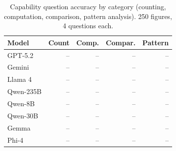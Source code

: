 \begin{table}[t]
\centering
\small
\begin{tabular}{@{}lrrrr@{}}
\toprule
\textbf{Model} & \textbf{Count} & \textbf{Comp.} & \textbf{Compar.} & \textbf{Pattern} \\
\midrule
GPT-5.2 & -- & -- & -- & -- \\
Gemini & -- & -- & -- & -- \\
Llama 4 & -- & -- & -- & -- \\
Qwen-235B & -- & -- & -- & -- \\
Qwen-8B & -- & -- & -- & -- \\
Qwen-30B & -- & -- & -- & -- \\
Gemma & -- & -- & -- & -- \\
Phi-4 & -- & -- & -- & -- \\
\bottomrule
\end{tabular}
\caption{Capability question accuracy by category (counting, computation, comparison, pattern analysis). 250 figures, 4 questions each.}
\label{tab:capability}
\end{table}